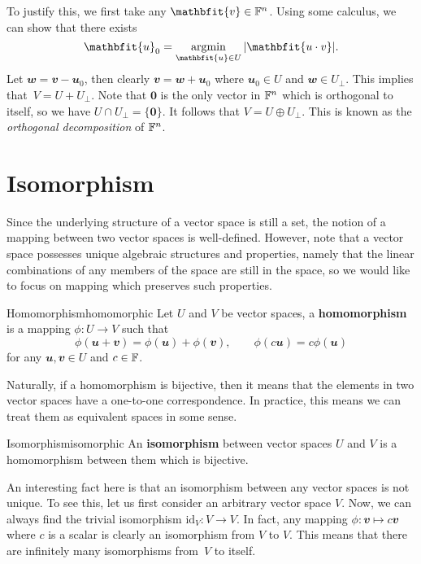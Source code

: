 \documentclass[math, code]{amznotes}
\theoremstyle{remark}
\newcommand{\zero}{\mathbf{0}}
\DeclareMathOperator*{\argmin}{argmin}
\begin{document}
To justify this, we first take any $\mathbfit{v} \in \F^n$. Using some calculus, we can show that there exists 
\begin{equation*}
    \mathbfit{u}_0 = \argmin_{\mathbfit{u} \in U}\abs{\mathbfit{u \cdot v}}.
\end{equation*}
Let $\mathbfit{w = v - u}_0$, then clearly $\mathbfit{v = w + u}_0$ where $\mathbfit{u}_0 \in U$ and $\mathbfit{w} \in U_{\perp}$. This implies that~$V = U + U_{\perp}$. Note that $\zero$ is the only vector in $\mathbb{F}^n$ which is orthogonal to itself, so we have $U \cap U_{\perp} = \{\zero\}$. It follows that $V = U \oplus U_{\perp}$. This is known as the \textit{orthogonal decomposition} of $\mathbb{F}^n$.
\section{Isomorphism}
Since the underlying structure of a vector space is still a set, the notion of a mapping between two vector spaces is well-defined. However, note that a vector space possesses unique algebraic structures and properties, namely that the linear combinations of any members of the space are still in the space, so we would like to focus on mapping which preserves such properties.
\begin{dfnbox}{Homomorphism}{homomorphic}
    Let $U$ and $V$ be vector spaces, a {\color{red} \textbf{homomorphism}} is a mapping $\phi \colon U \to V$ such that
    \begin{equation*}
        \phi(\mathbfit{u + v}) = \phi(\mathbfit{u}) + \phi(\mathbfit{v}), \qquad \phi(c\mathbfit{u}) = c\phi(\mathbfit{u})
    \end{equation*}
    for any $\mathbfit{u}, \mathbfit{v} \in U$ and $c \in \mathbb{F}$.
\end{dfnbox}
Naturally, if a homomorphism is bijective, then it means that the elements in two vector spaces have a one-to-one correspondence. In practice, this means we can treat them as equivalent spaces in some sense.
\begin{dfnbox}{Isomorphism}{isomorphic}
    An {\color{red} \textbf{isomorphism}} between vector spaces $U$ and $V$ is a homomorphism between them which is bijective.
\end{dfnbox}
An interesting fact here is that an isomorphism between any vector spaces is not unique. To see this, let us first consider an arbitrary vector space $V$. Now, we can always find the trivial isomorphism $\mathrm{id}_V \colon V \to V$. In fact, any mapping $\phi \colon \mathbfit{v} \mapsto c\mathbfit{v}$ where $c$ is a scalar is clearly an isomorphism from $V$ to $V$. This means that there are infinitely many isomorphisms from~$V$ to itself.
\end{document}
